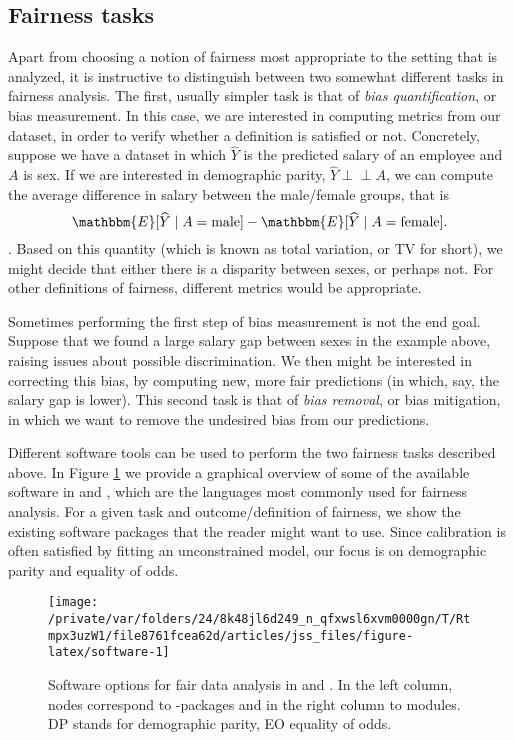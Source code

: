 \documentclass[
  nojss]{jss}
\begin{document}
\hypertarget{fairness-tasks}{%
\subsection{Fairness tasks}\label{fairness-tasks}}

Apart from choosing a notion of fairness most appropriate to the setting
that is analyzed, it is instructive to distinguish between two somewhat
different tasks in fairness analysis. The first, usually simpler task is
that of \emph{bias quantification}, or bias measurement. In this case,
we are interested in computing metrics from our dataset, in order to
verify whether a definition is satisfied or not. Concretely, suppose we
have a dataset in which \(\widehat{Y}\) is the predicted salary of an
employee and \(A\) is sex. If we are interested in demographic parity,
\(\widehat{Y} {\perp\!\!\!\perp}A\), we can compute the average
difference in salary between the male/female groups, that is
\[\mathbbm{E}[\widehat{Y} \mid A = \text{male}] - \mathbbm{E}[\widehat{Y} \mid A = \text{female}].\].
Based on this quantity (which is known as total variation, or TV for
short), we might decide that either there is a disparity between sexes,
or perhaps not. For other definitions of fairness, different metrics
would be appropriate.

Sometimes performing the first step of bias measurement is not the end
goal. Suppose that we found a large salary gap between sexes in the
example above, raising issues about possible discrimination. We then
might be interested in correcting this bias, by computing new, more fair
predictions (in which, say, the salary gap is lower). This second task
is that of \emph{bias removal}, or bias mitigation, in which we want to
remove the undesired bias from our predictions.

Different software tools can be used to perform the two fairness tasks
described above. In Figure \ref{fig:software} we provide a graphical
overview of some of the available software in  and
, which are the languages most commonly used for fairness
analysis. For a given task and outcome/definition of fairness, we show
the existing software packages that the reader might want to use. Since
calibration is often satisfied by fitting an unconstrained model, our
focus is on demographic parity and equality of odds.

\begin{CodeChunk}
\begin{figure}

{\centering \texttt{[image: /private/var/folders/24/8k48jl6d249\_n\_qfxwsl6xvm0000gn/T/Rtmpx3uzW1/file8761fcea62d/articles/jss\_files/figure-latex/software-1]} 

}

\caption{Software options for fair data analysis in  and . In the left column, nodes correspond to -packages and in the right column to  modules. DP stands for demographic parity, EO equality of odds.}\label{fig:software}
\end{figure}
\end{CodeChunk}
\end{document}
